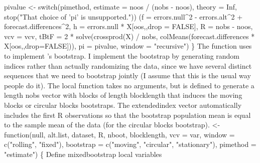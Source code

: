 \documentclass[10pt]{article}%
\newcommand\citepos[2][]{\citeauthor{#2}'s \citeyearpar[#1]{#2}}
\begin{document}
  pivalue <- switch(pimethod, estimate = noos / (nobs - noos), theory = Inf,
                    stop("That choice of 'pi' is unsupported."))
  (f = errors.null^2 - errors.alt^2 + forecast.differences^2,
                  h = errors.null * X[oos,,drop = FALSE],
                  R = nobs - noos, vcv = vcv,
                  tBtF = 2 * solve(crossprod(X) / nobs,
                    colMeans(forecast.differences * X[oos,,drop=FALSE])),
                  pi = pivalue, window = "recursive")
\}
\eatline
{}\nwendcode{}\nwdocspar
The {\Tt{}\nwendquote} function uses {\Tt{}\nwendquote} to
implement \citepos{Cal:11b} bootstrap.  I implement the bootstrap by
generating random indices rather than actually randomizing the data,
since we have several distinct sequences that we need to bootstrap
jointly (I assume that this is the usual way people do it).  The local
function {\Tt{}\nwendquote} takes no arguments, but is defined to generate
a length {\Tt{}nobs\nwendquote} vector with blocks of length {\Tt{}blocklength\nwendquote} that
induces the moving blocks \citep{Kun:89,LiS:92} or circular blocks
\citep{PoR:92} bootstraps.  
The {\Tt{}extendedindex\nwendquote} vector automatically
includes the first {\Tt{}R\nwendquote} observations so that the bootstrap population
mean is equal to the sample mean of the data (for the circular blocks
bootstrap).
\nwenddocs{}\plusendmoddef\nwstartdeflinemarkup{}\nwenddeflinemarkup
{} <- function(null, alt.list, dataset, R, nboot, blocklength,
                           vcv = var, window = c("rolling", "fixed"),
                           bootstrap = c("moving", "circular", "stationary"),
                           pimethod = "estimate") \{
  \LA{}Define \code{}mixedbootstrap\edoc{} local variables~{\nwtagstyle{}}\RA{}
\end{document}

